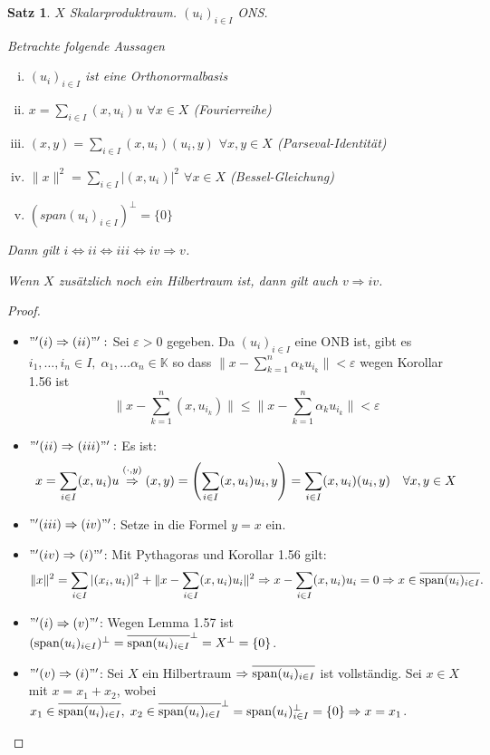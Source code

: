 \documentclass[ngerman]{report}
\theoremstyle{plain}%
\newtheorem{thm}{Satz}[chapter]
\theoremstyle{definition}%
\theoremstyle{myStyle}
\newcommand{\K}{\mathbb{K}}
\newcommand{\aufspan}{\textnormal{span}}
\newcommand{\norm}[1]{\|#1\|}
\newcommand{\df}[1][]{%
	\overset{#1}{\Rightarrow}
}
\newcommand{\aq}{\Leftrightarrow} %
\newcommand{\ff}[3]{(#1_#2)_{#2\in#3}}
\begin{document}
 	\begin{thm}
		$X$ Skalarproduktraum. $\ff{u}{i}{I}$ ONS.\par
		Betrachte folgende Aussagen
			\begin{enumerate}[(i)]
				\item $\ff{u}{i}{I}$ ist eine Orthonormalbasis
				\item $x = \sum_{i\in I} (x, u_i)u$ $\forall x\in X$ (Fourierreihe)
				\item $(x,y) = \sum_{i\in I}(x,u_i)(u_i,y)$ $\forall x,y \in X$ (Parseval-Identität)
				\item $\norm{x}^2 = \sum_{i\in I}|(x,u_i)|^2$ $\forall x\in X$ (Bessel-Gleichung)
				\item $(span\ff{u}{i}{I})^\perp = \{0\}$
			\end{enumerate}
			Dann gilt $i \aq ii \aq iii \aq iv \df v$.\par
			Wenn $X$ zusätzlich noch ein Hilbertraum ist, dann gilt auch $v\df iv$.
	\end{thm}	
	\begin{proof}
		\begin{itemize}[]
		\item $"'(i)\df(ii)"':$ Sei $\varepsilon > 0$ gegeben. Da $(u_i)_{i\in I}$ eine ONB ist, gibt es $i_1,\dots,i_n\in I,\;\alpha_1,\dots \alpha_n \in \K$ so dass $\|x- \sum^n_{k=1} \alpha_k u_{i_k}\| < \varepsilon$ wegen Korollar 1.56 ist
		$$\|x- \sum^n_{k=1} (x, u_{i_k})\| \leq \|x-\sum^n_{k=1} \alpha_k u_{i_k}\| < \varepsilon$$
		\item $"'(ii) \df (iii)"':$ Es ist:
		$$x = \sum_{i\in I} (x, u_i)u \overset{(\cdot, y)}{\df} (x,y)=\left(\sum_{i\in I} (x, u_i)u_i,y\right)=\sum_{i\in I} (x,u_i)(u_i,y)\quad \forall x,y\in X$$
		\item $"'(iii) \df (iv)"'$: Setze in die Formel $y=x$ ein.
		\item $"'(iv) \df (i)"'$: Mit Pythagoras und Korollar 1.56 gilt:
		$$\|x\|^2 = \sum_{i\in I} |(x_i,u_i)|^2 + \|x- \sum_{i\in I} (x,u_i)u_i\|^2 \df x- \sum_{i\in I} (x,u_i)u_i = 0 \df x \in \overline{\aufspan (u_i)_{i\in I}}.$$
		\item $"'(i) \df (v)"'$: Wegen Lemma 1.57 ist $(\aufspan (u_i)_{i\in I})^\perp =\overline{\aufspan (u_i)_{i\in I}}^\perp = X^\perp = \{0\}$.
		\item $"'(v)\df(i)"'$: Sei $X$ ein Hilbertraum $\df \overline{\aufspan (u_i)_{i\in I}}$ ist vollständig. Sei $x\in X$ mit $x = x_1+x_2$, wobei $x_1 \in \overline{\aufspan (u_i)_{i\in I}},\;x_2\in \overline{\aufspan (u_i)_{i\in I}}^\perp =  \aufspan (u_i)_{i\in I}^\perp = \{0\} \df x = x_1$.
		\end{itemize}
	\end{proof}
\end{document}
